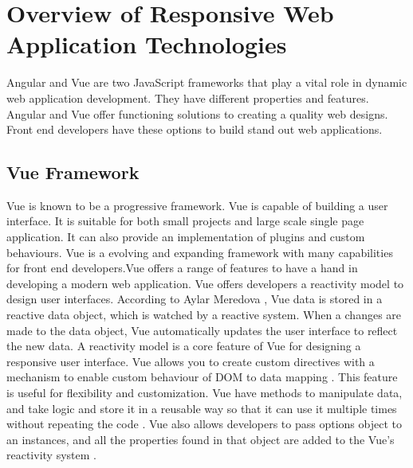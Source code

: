 \documentclass[10pt,journal,compsoc]{IEEEtran}
\begin{document}
\section{Overview of Responsive Web Application Technologies}
Angular and Vue are two JavaScript frameworks that play a vital role in dynamic web application development. They have different properties and features. Angular and Vue offer functioning solutions to creating a quality web designs. Front end developers have these options to build stand out web applications.

\subsection{Vue Framework}
Vue is known to be a progressive framework. Vue is capable of building a user interface. It is suitable for both small projects and large scale single page
application\cite{wohlgethan2018supportingweb}. It can also provide an implementation of plugins and custom behaviours. Vue is a evolving and expanding framework with many capabilities for front end developers\cite{filipova2016learning}.Vue offers a range of features to have a hand in developing a modern web application. Vue offers developers a reactivity model to design user interfaces. According to Aylar Meredova \cite{meredova2023comparison}, Vue data is stored in a reactive data object, which is watched by a reactive system. When a changes are made to the data object, Vue automatically updates the user interface to reflect the new data\cite{meredova2023comparison}. A reactivity model is a core feature of Vue for designing a responsive user interface. Vue allows you to create custom directives with a mechanism to enable custom behaviour of DOM to data mapping \cite{filipova2016learning}. This feature is useful for flexibility and customization. Vue have methods to manipulate data, and take logic and store it in a reusable way so that it can use it multiple times without repeating the code \cite{macrae2018vue}. Vue also allows developers to pass options object to an instances, and all the properties found in that object are added to the Vue’s reactivity system \cite{cincovic2020comparison}.
\end{document}
